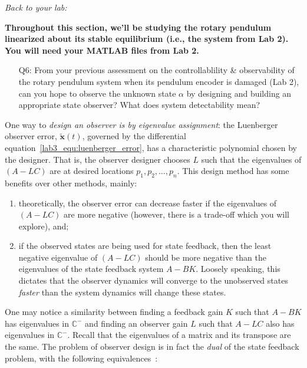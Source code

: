 \noindent \emph{Back to your lab:}

\textbf{Throughout this section, we'll be studying the rotary pendulum linearized about its stable equilibrium (i.e., the system from Lab 2). You will need your MATLAB files from Lab 2.}
\begin{enumerate}
    \item[Q6:] From your previous assessment on the controllablility \& observability of the rotary pendulum system when its pendulum encoder is damaged (Lab 2), can you hope to observe the unknown state $\alpha$ by designing and building an appropriate state observer? What does system detectability mean?
\end{enumerate}
One way to \emph{design an observer is by eigenvalue assignment}: the Luenberger observer error, $\tilde{\mathbf{x}}(t)$, governed by the differential equation~\eqref{lab3_equ:luenberger_error}, has a characteristic polynomial chosen by the designer. That is, the observer designer chooses $L$ such that the eigenvalues of $(A-LC)$ are at desired locations $p_1, p_2, \dots, p_n$. This design method has some benefits over other methods, mainly:
\begin{enumerate}
    \item theoretically, the observer error can decrease faster if the eigenvalues of $(A-LC)$ are more negative (however, there is a trade-off which you will explore), and;
    \item if the observed states are being used for state feedback, then the least negative eigenvalue of $(A-LC)$ should be more negative than the eigenvalues of the state feedback system $A-BK$. Loosely speaking, this dictates that the observer dynamics will converge to the unobserved states \emph{faster} than the system dynamics will change these states.
\end{enumerate}
One may notice a similarity between finding a feedback gain $K$ such that $A-BK$ has eigenvalues in $\mathbb{C}^-$ and finding an observer gain $L$ such that $A-LC$ also has eigenvalues in $\mathbb{C}^-$. Recall that the eigenvalues of a matrix and its transpose are the same. The problem of observer design is in fact the \emph{dual} of the state feedback problem, with the following equivalences~\cite{astrom2010feedback}:
